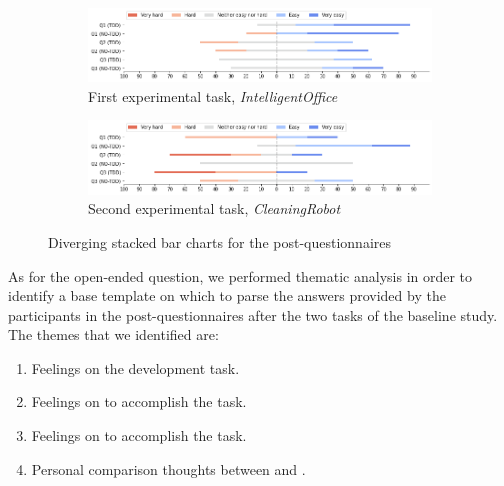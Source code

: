 \begin{figure}[htbp]
    \begin{subfigure}{\textwidth}
        \includegraphics[width=\textwidth]{figures/bar_charts/task1.png}
        \caption{First experimental task, \textit{IntelligentOffice}}
    \end{subfigure}
    
    \bigskip
    
    \begin{subfigure}{\textwidth}
        \includegraphics[width=\textwidth]{figures/bar_charts/task2.png}
        \caption{Second experimental task, \textit{CleaningRobot}}
    \end{subfigure}
    
    \caption{Diverging stacked bar charts for the post-questionnaires}
    \label{bar_charts}
\end{figure}

As for the open-ended question, we performed thematic analysis in order to identify a base template on which to parse the answers provided by the participants in the post-questionnaires after the two tasks of the baseline study.
The themes that we identified are:
\begin{enumerate}
    \item Feelings on the development task.
    \item Feelings on \tdd to accomplish the task.
    \item Feelings on \notdd to accomplish the task.
    \item Personal comparison thoughts between \tdd and \notdd.
\end{enumerate}

